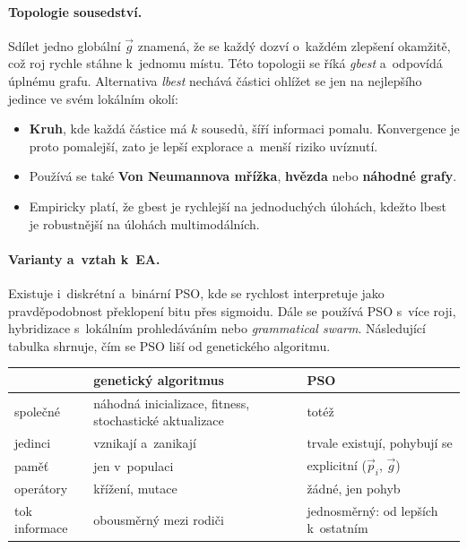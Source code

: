 \documentclass[11pt,a4paper]{article}
\theoremstyle{definition}
\begin{document}
\paragraph{Topologie sousedství.} Sdílet jedno globální $\vec g$ znamená, že se každý dozví
o~každém zlepšení okamžitě, což roj rychle stáhne k~jednomu místu. Této topologii se říká
\emph{gbest} a~odpovídá úplnému grafu. Alternativa \emph{lbest} nechává částici ohlížet se jen
na nejlepšího jedince ve svém lokálním okolí:
\begin{itemize}
\item \textbf{Kruh}, kde každá částice má $k$ sousedů, šíří informaci pomalu. Konvergence je
  proto pomalejší, zato je lepší explorace a~menší riziko uvíznutí.
\item Používá se také \textbf{Von Neumannova mřížka}, \textbf{hvězda} nebo \textbf{náhodné
  grafy}.
\item Empiricky platí, že gbest je rychlejší na jednoduchých úlohách, kdežto lbest je
  robustnější na úlohách multimodálních.
\end{itemize}

\paragraph{Varianty a~vztah k~EA.}
Existuje i~diskrétní a~binární PSO, kde se rychlost interpretuje jako pravděpodobnost
překlopení bitu přes sigmoidu. Dále se používá PSO s~více roji, hybridizace s~lokálním
prohledáváním nebo \emph{grammatical swarm}. Následující tabulka shrnuje, čím se PSO liší od
genetického algoritmu.

\begin{center}
\begin{tabular}{@{}p{5cm}p{5cm}p{5.2cm}@{}}
\toprule
 & \textbf{genetický algoritmus} & \textbf{PSO} \\
\midrule
společné & náhodná inicializace, fitness, stochastické aktualizace &
  totéž \\
jedinci & vznikají a~zanikají & trvale existují, pohybují se \\
paměť & jen v~populaci & explicitní ($\vec p_i$, $\vec g$) \\
operátory & křížení, mutace & žádné, jen pohyb \\
tok informace & obousměrný mezi rodiči & jednosměrný: od lepších k~ostatním \\
\bottomrule
\end{tabular}
\end{center}
\end{document}
